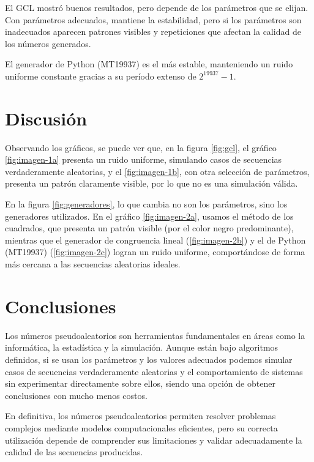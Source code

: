 \documentclass{article}
\begin{document}
El GCL mostró buenos resultados, pero depende de los parámetros que se elijan. Con parámetros adecuados, mantiene la estabilidad, pero si los parámetros son inadecuados aparecen patrones visibles y repeticiones que afectan la calidad de los números generados.

El generador de Python (MT19937) es el más estable, manteniendo un ruido uniforme constante gracias a su período extenso de $2^{19937}-1$.



\section{Discusión}

Observando los gráficos, se puede ver que, en la figura \ref{fig:gcl}, el gráfico \ref{fig:imagen-1a} presenta un ruido uniforme, simulando casos de secuencias verdaderamente aleatorias, y el \ref{fig:imagen-1b}, con otra selección de parámetros, presenta un patrón claramente visible, por lo que no es una simulación válida.

En la figura \ref{fig:generadores}, lo que cambia no son los parámetros, sino los generadores utilizados. En el gráfico \ref{fig:imagen-2a}, usamos el método de los cuadrados, que presenta un patrón visible (por el color negro predominante), mientras que el generador de congruencia lineal (\ref{fig:imagen-2b}) y el de Python (MT19937) (\ref{fig:imagen-2c}) logran un ruido uniforme, comportándose de forma más cercana a las secuencias aleatorias ideales.




\section{Conclusiones}

Los números pseudoaleatorios son herramientas fundamentales en áreas como la informática, la estadística y la simulación. Aunque están bajo algoritmos definidos, si se usan los parámetros y los valores adecuados podemos simular casos de secuencias verdaderamente aleatorias y el comportamiento de sistemas sin experimentar directamente sobre ellos, siendo una opción de obtener conclusiones con mucho menos costos.

En definitiva, los números pseudoaleatorios permiten resolver problemas complejos mediante modelos computacionales eficientes, pero su correcta utilización depende de comprender sus limitaciones y validar adecuadamente la calidad de las secuencias producidas.




\nocite{*}



\end{document}
